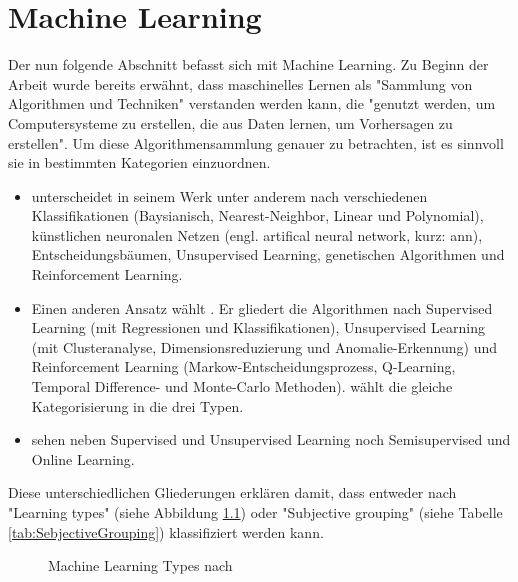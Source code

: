 \chapter{Machine Learning}\label{sec:MachineLearning}
Der nun folgende Abschnitt befasst sich mit Machine Learning. Zu Beginn der Arbeit wurde bereits erwähnt, dass maschinelles Lernen als "Sammlung von Algorithmen und Techniken" verstanden werden kann, die "genutzt werden, um Computersysteme zu erstellen, die aus Daten lernen, um Vorhersagen zu erstellen".\citep[S.~53; eigene Übersetzung]{swamynathan_mastering_2017} Um diese Algorithmensammlung genauer zu betrachten, ist es sinnvoll sie in bestimmten Kategorien einzuordnen. 
\begin{itemize}
\item \citep{kubat_introduction_2017} unterscheidet in seinem Werk unter anderem nach verschiedenen Klassifikationen (Baysianisch, Nearest-Neighbor, Linear und Polynomial), künstlichen neuronalen Netzen (engl. artifical neural network, kurz: \gls{ann}), Entscheidungsbäumen, Unsupervised Learning, genetischen Algorithmen und Reinforcement Learning.
\item Einen anderen Ansatz wählt \citep{swamynathan_mastering_2017}. Er gliedert die Algorithmen nach Supervised Learning (mit Regressionen und Klassifikationen), Unsupervised Learning (mit Clusteranalyse, Dimensionsreduzierung und Anomalie-Erkennung) und Reinforcement Learning (Markow-Entscheidungsprozess, Q-Learning, Temporal Difference- und Monte-Carlo Methoden). \citep{kim_matlab_2017} wählt die gleiche Kategorisierung in die drei Typen.
\item \citep{paluszek_matlab_2017} sehen neben Supervised und Unsupervised Learning noch Semisupervised und Online Learning.
\end{itemize}
Diese unterschiedlichen Gliederungen erklären \citep[S.~222]{ramasubramanian_machine_2017} damit, dass entweder nach "Learning types" (siehe Abbildung \ref{fig:MachineLearningTypes_all}) oder "Subjective grouping" (siehe Tabelle \ref{tab:SebjectiveGrouping}) klassifiziert werden kann.
\begin{figure}[H]
\centering
{}
\caption{Machine Learning Types nach \citep[S.~222]{ramasubramanian_machine_2017}}
\label{fig:MachineLearningTypes_all}
\end{figure}

